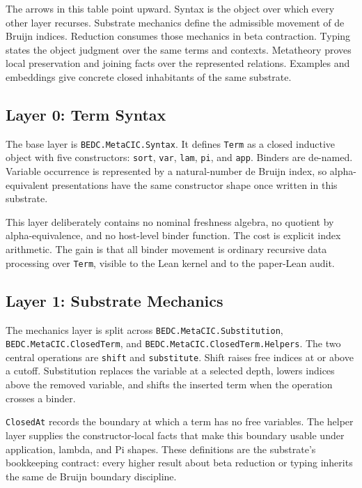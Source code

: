 The arrows in this table point upward. Syntax is the object over which every
other layer recurses. Substrate mechanics define the admissible movement of
de Bruijn indices. Reduction consumes those mechanics in beta contraction.
Typing states the object judgment over the same terms and contexts.
Metatheory proves local preservation and joining facts over the represented
relations. Examples and embeddings give concrete closed inhabitants of the
same substrate.

\subsection{Layer 0: Term Syntax}
\label{subsec:substrate-layer-term-syntax}

The base layer is \texttt{BEDC.MetaCIC.Syntax}. It defines
\texttt{Term} as a closed inductive object with five constructors:
\texttt{sort}, \texttt{var}, \texttt{lam}, \texttt{pi}, and \texttt{app}.
Binders are de-named. Variable occurrence is represented by a natural-number
de Bruijn index, so alpha-equivalent presentations have the same constructor
shape once written in this substrate.

This layer deliberately contains no nominal freshness algebra, no quotient by
alpha-equivalence, and no host-level binder function. The cost is explicit
index arithmetic. The gain is that all binder movement is ordinary recursive
data processing over \texttt{Term}, visible to the Lean kernel and to the
paper-Lean audit.

\subsection{Layer 1: Substrate Mechanics}
\label{subsec:substrate-layer-mechanics}

The mechanics layer is split across \texttt{BEDC.MetaCIC.Substitution},
\texttt{BEDC.MetaCIC.ClosedTerm}, and
\texttt{BEDC.MetaCIC.ClosedTerm.Helpers}. The two central operations are
\texttt{shift} and \texttt{substitute}. Shift raises free indices at or above
a cutoff. Substitution replaces the variable at a selected depth, lowers
indices above the removed variable, and shifts the inserted term when the
operation crosses a binder.

\texttt{ClosedAt} records the boundary at which a term has no free variables.
The helper layer supplies the constructor-local facts that make this boundary
usable under application, lambda, and Pi shapes. These definitions are the
substrate's bookkeeping contract: every higher result about beta reduction or
typing inherits the same de Bruijn boundary discipline.

